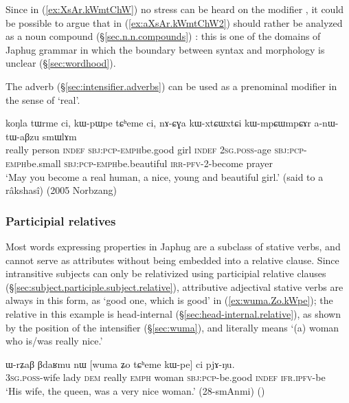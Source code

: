 Since in (\ref{ex:XsAr.kWmtChW}) no stress can be heard on the modifier , it could be possible to argue that  in  (\ref{ex:aXsAr.kWmtChW2}) should rather be analyzed as a noun compound (§\ref{sec.n.n.compounds}) : this is one of the domains of Japhug grammar in which the boundary between syntax and morphology is unclear (§\ref{sec:wordhood}).

The adverb  (§\ref{sec:intensifier.adverbs}) can be used as a prenominal modifier in the sense of `real'.

\begin{exe}
\ex \label{ex:koNla.tWrme}
\gll koŋla tɯrme ci, kɯ-pɯ\redp{}pe tɕʰeme ci,  nɤ-ɕɣa kɯ-xtɕɯ\redp{}xtɕi kɯ-mpɕɯ\redp{}mpɕɤr a-nɯ-tɯ-aβzu smɯlɤm \\
really person \textsc{indef} \textsc{sbj}:\textsc{pcp}-\textsc{emph}\redp{}be.good girl \textsc{indef} \textsc{2sg}.\textsc{poss}-age \textsc{sbj}:\textsc{pcp}-\textsc{emph}\redp{}be.small \textsc{sbj}:\textsc{pcp}-\textsc{emph}\redp{}be.beautiful \textsc{irr}-\textsc{pfv}-2-become prayer \\
\glt `May you become a real human, a nice, young and beautiful girl.' (said to a râkshasî) (2005 Norbzang)
\end{exe}

\subsubsection{Participial relatives} \label{ex:attributive.participles.stative.verbs}
Most words expressing properties in Japhug are a subclass of stative verbs, and cannot serve as attributes without being embedded into a relative clause. Since intransitive subjects can only be relativized using  participial relative clauses (§\ref{sec:subject.participle.subject.relative}), attributive adjectival stative verbs are always in this form, as  `good one, which is good' in (\ref{ex:wuma.Zo.kWpe}); the relative   in this example is head-internal (§\ref{sec:head-internal.relative}), as shown by the position of the intensifier  (§\ref{sec:wuma}), and literally means `(a) woman who is/was really nice.'

\begin{exe}
   \ex  \label{ex:wuma.Zo.kWpe}
\gll  ɯ-rʑaβ βdaʁmu nɯ [wuma ʑo tɕʰeme kɯ-pe] ci pjɤ-ŋu. \\
\textsc{3sg}.\textsc{poss}-wife lady \textsc{dem} really \textsc{emph} woman \textsc{sbj}:\textsc{pcp}-be.good \textsc{indef} \textsc{ifr}.\textsc{ipfv}-be \\
\glt `His wife, the queen, was a very nice woman.' (28-smAnmi)
()
\end{exe}  

